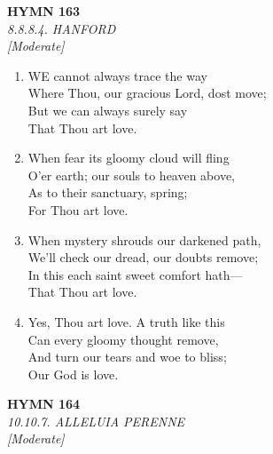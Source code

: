 \documentclass[11pt,a4paper]{article}
\begin{document}
\newpage
\begin{center}
    {\Large \textbf{HYMN 163}}
    \\
    \textit{8.8.8.4. HANFORD}
    \\
    \textit{\small [Moderate]}
\end{center}
\vspace{1em}

\begin{enumerate}
    \item WE cannot always trace the way \\
        Where Thou, our gracious Lord, dost move; \\
        But we can always surely say \\
        That Thou art love.

    \item When fear its gloomy cloud will fling \\
        O'er earth; our souls to heaven above, \\
        As to their sanctuary, spring; \\
        For Thou art love.

    \item When mystery shrouds our darkened path, \\
        We'll check our dread, our doubts remove; \\
        In this each saint sweet comfort hath--- \\
        That Thou art love.

    \item Yes, Thou art love. A truth like this \\
        Can every gloomy thought remove, \\
        And turn our tears and woe to bliss; \\
        Our God is love.

\end{enumerate}

\newpage
\begin{center}
    {\Large \textbf{HYMN 164}}
    \\
    \textit{10.10.7. ALLELUIA PERENNE}
    \\
    \textit{\small [Moderate]}
\end{center}
\vspace{1em}
\end{document}
